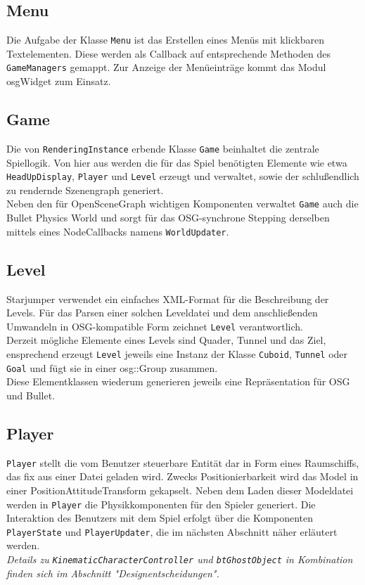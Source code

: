 \documentclass{llncs}
\begin{document}
\subsection{Menu}
Die Aufgabe der Klasse \texttt{Menu} ist das Erstellen eines Men\"us mit klickbaren Textelementen. Diese
werden als Callback auf entsprechende Methoden des \texttt{GameManagers} gemappt. Zur Anzeige der Men\"ueintr\"age
kommt das Modul osgWidget zum Einsatz.

\subsection{Game}
Die von \texttt{RenderingInstance} erbende Klasse \texttt{Game} beinhaltet die zentrale Spiellogik. Von hier aus werden die
f\"ur das Spiel ben\"otigten Elemente wie etwa \texttt{HeadUpDisplay}, \texttt{Player} und \texttt{Level} erzeugt und verwaltet,
sowie der schlu\ss endlich zu rendernde Szenengraph generiert.\\
Neben den f\"ur OpenSceneGraph wichtigen Komponenten verwaltet \texttt{Game} auch die Bullet Physics World und sorgt
f\"ur das OSG-synchrone Stepping derselben mittels eines NodeCallbacks namens \texttt{WorldUpdater}.

\subsection{Level}
Starjumper verwendet ein einfaches XML-Format f\"ur die Beschreibung der Levels. F\"ur das Parsen einer
solchen Leveldatei und dem anschlie\ss enden Umwandeln in OSG-kompatible Form zeichnet \texttt{Level} verantwortlich.\\
Derzeit m\"ogliche Elemente eines Levels sind Quader, Tunnel und das Ziel, ensprechend erzeugt \texttt{Level}
jeweils eine Instanz der Klasse \texttt{Cuboid}, \texttt{Tunnel} oder \texttt{Goal} und f\"ugt sie in einer osg::Group zusammen.\\
Diese Elementklassen wiederum generieren jeweils eine Repr\"asentation f\"ur OSG und Bullet.

\subsection{Player}
\texttt{Player} stellt die vom Benutzer steuerbare Entit\"at dar in Form eines Raumschiffs, das fix aus einer Datei
geladen wird. Zwecks Positionierbarkeit wird das Model in einer PositionAttitudeTransform gekapselt.
Neben dem Laden dieser Modeldatei werden in \texttt{Player} die Physikkomponenten f\"ur den Spieler generiert.
Die Interaktion des Benutzers mit dem Spiel erfolgt \"uber die Komponenten \texttt{PlayerState} und \texttt{PlayerUpdater},
die im n\"achsten Abschnitt n\"aher erl\"autert werden.\\
\textit{Details zu \texttt{KinematicCharacterController} und \texttt{btGhostObject} in Kombination finden sich im Abschnitt "Designentscheidungen".}
\end{document}
